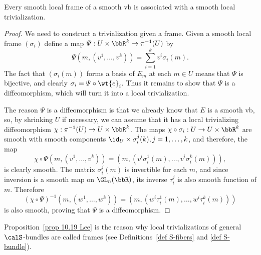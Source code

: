 \begin{prop}\label{prop 10.19 Lee}
    Every smooth local frame of a smooth \gls{vb} is associated with a smooth local trivialization.
\end{prop}
\begin{proof}
    We need to construct a trivialization given a frame. Given a smooth local frame $(\sigma_i)$ define a map $\varPsi:U\times\bbR^k\to \pi^{-1}(U)$ by
    \[\varPsi(m,(v^1,\ldots,v^k))=\sum_{i=1}^k v^i\sigma_i(m).\]
    The fact that $(\sigma_i(m))$ forms a basis of $E_m$ at each $m\in U$ means that $\varPsi$ is bijective, and clearly $\sigma_i=\varPsi\circ \wt{e}_i$.  Thus it remains to show that $\varPsi$ is a diffeomorphism, which will turn it into a local trivialization.

    The reason $\varPsi$ is a diffeomorphism is that we already know that $E$ is a smooth \gls{vb}, so, by shrinking $U$ if necessary, we can assume that it has a local trivializing diffeomorphism $\chi:\pi^{-1}(U)\to U\times\bbR^k$. The maps $\chi\circ \sigma_i:U\to U\times\bbR^k$ are smooth with smooth components $\id_U\times \sigma^j_i(k),j=1,\ldots,k$, and therefore, the map
    \[\chi\circ\varPsi(m,(v^1,\ldots,v^k))=(m,(v^i\sigma^1_i(m),\ldots,v^i\sigma^k_i(m))),\]
    is clearly smooth. The matrix $\sigma_i^j(m)$ is invertible for each $m$, and since inversion is a smooth map on $\GL_n(\bbR)$, its inverse $\tau_i^j$ is also smooth function of $m$. Therefore
    \[(\chi\circ\varPsi)^{-1}(m,(w^1,\ldots,w^k))=(m,(w^i\tau_i^1(m),\ldots,w^i\tau_i^k(m)))\]
    is also smooth, proving that $\varPsi$ is a diffeomorphism.
\end{proof}

\begin{rem}
    Proposition~\ref{prop 10.19 Lee} is the reason why local trivializations of general $\calS$-bundles are called frames (see Definitions~\ref{def S-fibers} and \ref{def S-bundle}).
\end{rem}

